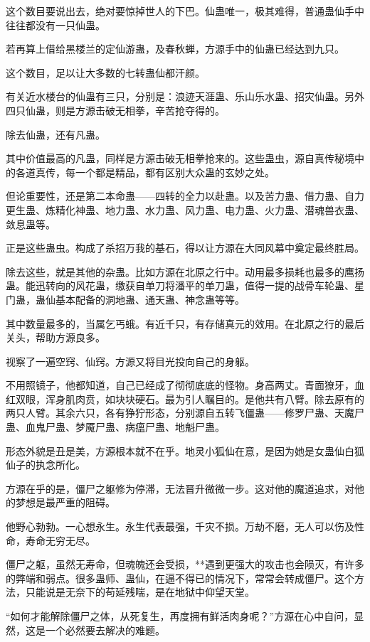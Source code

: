 \begin{this_body}
这个数目要说出去，绝对要惊掉世人的下巴。仙蛊唯一，极其难得，普通蛊仙手中往往都没有一只仙蛊。

若再算上借给黑楼兰的定仙游蛊，及春秋蝉，方源手中的仙蛊已经达到九只。

这个数目，足以让大多数的七转蛊仙都汗颜。

有关近水楼台的仙蛊有三只，分别是：浪迹天涯蛊、乐山乐水蛊、招灾仙蛊。另外四只仙蛊，则是方源击破无相拳，辛苦抢夺得的。

除去仙蛊，还有凡蛊。

其中价值最高的凡蛊，同样是方源击破无相拳抢来的。这些蛊虫，源自真传秘境中的各道真传，每一个都是精品，都有区别大众蛊的玄妙之处。

但论重要性，还是第二本命蛊——四转的全力以赴蛊。以及苦力蛊、借力蛊、自力更生蛊、炼精化神蛊、地力蛊、水力蛊、风力蛊、电力蛊、火力蛊、潜魂兽衣蛊、敛息蛊等。

正是这些蛊虫。构成了杀招万我的基石，得以让方源在大同风幕中奠定最终胜局。

除去这些，就是其他的杂蛊。比如方源在北原之行中。动用最多损耗也最多的鹰扬蛊。能迅转向的风花蛊，缴获自单刀将潘平的单刀蛊，值得一提的战骨车轮蛊、星门蛊，蛊仙基本配备的洞地蛊、通天蛊、神念蛊等等。

其中数量最多的，当属乞丐蛾。有近千只，有存储真元的效用。在北原之行的最后关头，帮助方源良多。

视察了一遍空窍、仙窍。方源又将目光投向自己的身躯。

不用照镜子，他都知道，自己已经成了彻彻底底的怪物。身高两丈。青面獠牙，血红双眼，浑身肌肉贲，如块块硬石。最为引人瞩目的。是他共有八臂。除去原有的两只人臂。其余六只，各有狰狞形态，分别源自五转飞僵蛊——修罗尸蛊、天魔尸蛊、血鬼尸蛊、梦魇尸蛊、病瘟尸蛊、地魁尸蛊。

形态外貌是丑是美，方源根本就不在乎。地灵小狐仙在意，是因为她是女蛊仙白狐仙子的执念所化。

方源在乎的是，僵尸之躯修为停滞，无法晋升微微一步。这对他的魔道追求，对他的梦想是最严重的阻碍。

他野心勃勃。一心想永生。永生代表最强，千灾不损。万劫不磨，无人可以伤及性命，寿命无穷无尽。

僵尸之躯，虽然无寿命，但魂魄还会受损，**遇到更强大的攻击也会陨灭，有许多的弊端和弱点。很多蛊师、蛊仙，在逼不得已的情况下，常常会转成僵尸。这个方法，只能说是无奈下的苟延残喘，是在地狱中仰望天堂。

“如何才能解除僵尸之体，从死复生，再度拥有鲜活肉身呢？”方源在心中自问，显然，这是一个必然要去解决的难题。


\end{this_body}
